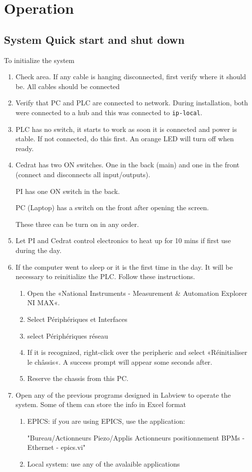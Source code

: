 \chapter{Operation}
\section{System Quick start and shut down}
To initialize the system\par
\begin{enumerate}
\item Check area. If any cable is hanging disconnected, first verify where it should be. All cables should be connected
\item Verify that PC and PLC are connected to network. During installation, both were connected to a hub and this was connected to \verb?ip-local?.
\item PLC has no switch, it starts to work as soon it is connected and power is stable. If not connected, do this first. An orange LED will turn off when ready.
\item Cedrat has two ON switches. One in the back (main) and one in the front (connect and disconnects all input/outputs).\par
PI has one ON switch in the back.\par
PC (Laptop) has a switch on the front after opening the screen.\par
These three can be turn on in any order.
\item Let PI and Cedrat control electronics to heat up for 10 mins if first use during the day.\par
\item If the computer went to sleep or it is the first time in the day. It will be necessary to reinitialize the PLC. Follow these instructions.
\begin{enumerate}
\item Open the «National Instruments - Measurement \& Automation Explorer NI MAX«.
\item Select Périphériques et Interfaces
\item select Périphériques réseau
\item If it is recognized, right-click over the peripheric and select «Réinitialiser le châssis«. A success prompt will appear some seconds after.
\item Reserve the chassis from this PC.
\end{enumerate}
\item Open any of the previous programs designed in Labview to operate the system. Some of them can store the info in Excel format
\begin{enumerate}
 \item  EPICS: if you are using EPICS, use the application:\par
"Bureau/Actionneurs Piezo/Applis Actionneurs positionnement BPMs - Ethernet - epics.vi"
\item Local system: use any of the avalaible applications\par
\end{enumerate}
\end{enumerate}
                                                          
